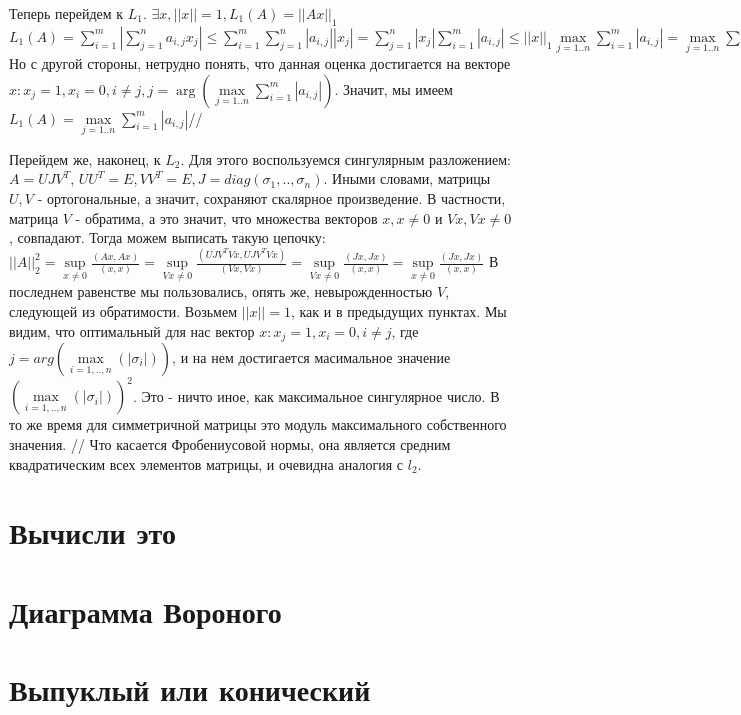 \documentclass{article}
\begin{document}
Теперь перейдем к $L_1$.  $\exists x, ||x|| = 1, L_1(A) = ||Ax||_1$
$
L_{1}(A) = \sum\limits_{i = 1}^{m} \left| \sum\limits_{j = 1}^{n} a_{i, j}x_j \right|
\leq
\sum\limits_{i = 1}^{m} \sum\limits_{j = 1}^{n} |a_{i, j}| |x_j|
=
\sum\limits_{j = 1}^{n} |x_j| \sum\limits_{i = 1}^{m} |a_{i, j}|
\leq
||x||_1 \max\limits_{j = 1 .. n} \sum\limits_{i = 1}^{m} |a_{i, j}|
=
\max\limits_{j = 1 .. n} \sum\limits_{i = 1}^{m}  |a_{i, j}|
$ \\

Но с другой стороны, нетрудно понять, что данная оценка достигается на векторе 
$x: x_j = 1, x_i = 0, i \neq j, j = \arg(\max\limits_{j = 1 .. n} \sum\limits_{i = 1}^{m} |a_{i, j}|)$. Значит, мы имеем $L_{1}(A) = \max\limits_{j = 1 .. n} \sum\limits_{i = 1}^{m}  |a_{i, j}|$//

Перейдем же, наконец, к $L_2$. Для этого воспользуемся
сингулярным разложением: $A = UJV^{T}$, $UU^{T} = E, VV^{T} = E, 
J = diag(\sigma_1, .. , \sigma_n)$. Иными словами, матрицы  $U, V$ - ортогональные,
а значит, сохраняют скалярное произведение. В частности, матрица $V$ - обратима, а это значит, что множества векторов $x, x \neq 0$ и $Vx, Vx \neq 0$, совпадают. Тогда можем выписать такую цепочку: $
||A||^2_2 = \sup\limits_{x \neq 0} \frac{(Ax, Ax)}{(x, x)} = 
 \sup\limits_{Vx \neq 0} \frac{(UJV^TVx, UJV^TVx)}{(Vx, Vx)} =
 \sup\limits_{Vx \neq 0} \frac{(Jx, Jx)}{(x, x)} =
 \sup\limits_{x \neq 0} \frac{(Jx, Jx)}{(x, x)}
$
В последнем равенстве мы пользовались, опять же, невырожденностью $V$, следующей 
из обратимости. Возьмем $||x|| = 1$, как и в предыдущих пунктах.
Мы видим, что оптимальный для нас вектор $x: x_j = 1, x_i = 0, i \neq j $, где 
$ j = arg(\max\limits_{i = 1, .., n}(|\sigma_i|))$, и на нем достигается масимальное
значение $(\max\limits_{i = 1, .., n}(|\sigma_i|))^2$. Это - ничто иное, как максимальное
сингулярное число. В то же время для симметричной матрицы это модуль максимального собственного значения. //
Что касается Фробениусовой нормы, она является средним квадратическим всех элементов матрицы, и очевидна аналогия с $l_2$.

\section{Вычисли это}
\section{Диаграмма Вороного}
\section{Выпуклый или конический}
\end{document}
